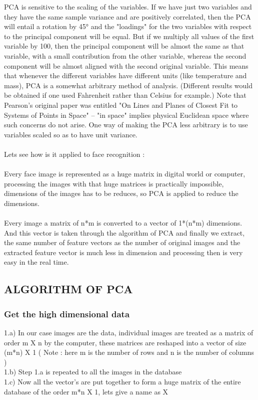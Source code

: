 \documentclass[10pt,a4paper]{article}
\begin{document}
PCA is sensitive to the scaling of the variables. If we have just two variables and they have the same sample variance and are positively correlated, then the PCA will entail a rotation by 45° and the "loadings" for the two variables with respect to the principal component will be equal. But if we multiply all values of the first variable by 100, then the principal component will be almost the same as that variable, with a small contribution from the other variable, whereas the second component will be almost aligned with the second original variable. This means that whenever the different variables have different units (like temperature and mass), PCA is a somewhat arbitrary method of analysis. (Different results would be obtained if one used Fahrenheit rather than Celsius for example.) Note that Pearson's original paper was entitled "On Lines and Planes of Closest Fit to Systems of Points in Space" – "in space" implies physical Euclidean space where such concerns do not arise. One way of making the PCA less arbitrary is to use variables scaled so as to have unit variance. \\ \\
Lets see how is it applied to face recognition : \\ \\
Every face image is represented as a huge matrix in digital world or computer, processing the images with that huge matrices is practically impossible, dimensions of the images has to be reduces, so PCA is applied to reduce the dimensions. \\ \\
Every image a matrix of n*m is converted to a vector of 1*(n*m) dimensions. And this vector is taken through the algorithm of PCA and finally we extract, the same number of feature vectors as the number of original images and the extracted feature vector is much less in dimension and processing then is very easy in the real time. \\ 


\subsection{ALGORITHM OF PCA}
\subsubsection{Get the high dimensional data} 

    1.a)  In our case images are the data, individual images are treated as a matrix of order m X n by the computer, these matrices are reshaped into a vector of size (m*n) X 1 ( Note : here m is the number of rows and n is the number of columns ) \\
    1.b) Step 1.a is repeated to all the images in the database \\
    1.c) Now all the vector’s are put together to form a huge matrix of the entire database of the order m*n X 1, lets give a name as X \\
\end{document}
